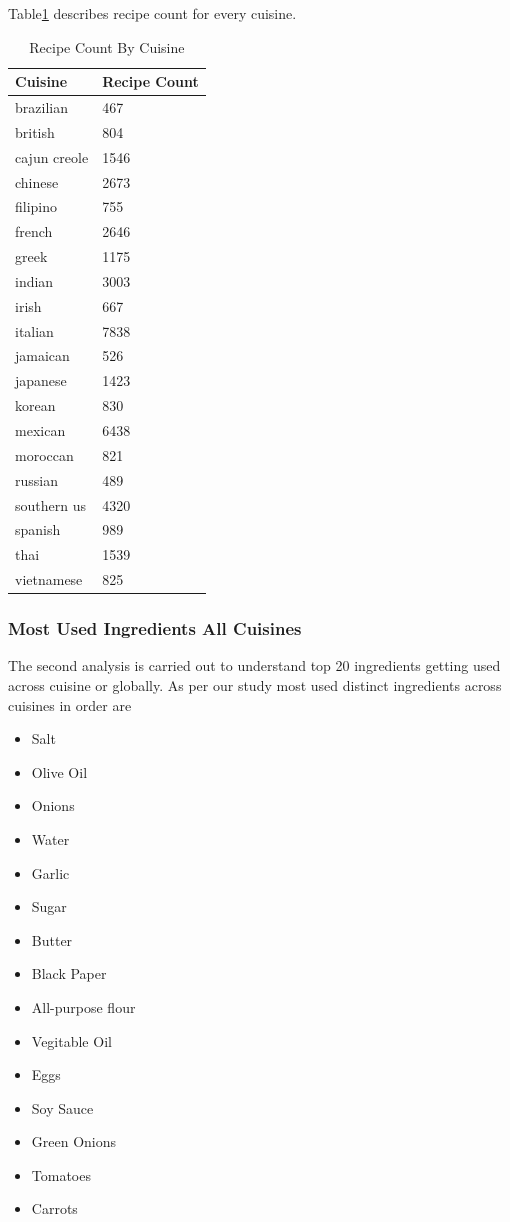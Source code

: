\documentclass[sigconf]{acmart}
\begin{document}
Table\ref{t:recipecount} describes recipe count for every cuisine.
\begin{table}[htb]
\centering
\caption{Recipe Count By Cuisine}
\label{t:recipecount}
\begin{tabular}{ll}
Cuisine & Recipe Count \\
\hline
brazilian & 467 \\
british         &        804 \\
cajun creole    &       1546 \\
chinese         &       2673\\
filipino        &        755\\
french          &       2646\\
greek           &       1175\\
indian          &       3003\\
irish           &        667\\
italian         &       7838\\
jamaican        &        526\\
japanese        &       1423\\
korean          &        830\\
mexican         &       6438\\
moroccan        &        821\\
russian         &        489\\
southern us     &       4320\\
spanish         &        989\\
thai            &       1539\\
vietnamese      &        825\\

\end{tabular}
\end{table}

\subsubsection{Most Used Ingredients All Cuisines}
The second analysis is carried out to understand top 20 ingredients getting used across cuisine or globally. As per our study most used distinct ingredients across cuisines in order are
\begin{itemize}
\item Salt
\item Olive Oil
\item Onions
\item Water
\item Garlic
\item Sugar
\item Butter
\item Black Paper
\item All-purpose flour
\item Vegitable Oil
\item Eggs
\item Soy Sauce
\item Green Onions
\item Tomatoes
\item Carrots
\end{itemize}
\end{document}
